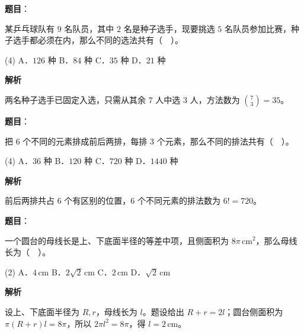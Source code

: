 \begin{answer}

\textbf{题目}：

某乒乓球队有 $9$ 名队员，其中 $2$ 名是种子选手，现要挑选 $5$ 名队员参加比赛，种子选手都必须在内，那么不同的选法共有（　）。

\begin{gkopts}(4)
\task A．$126$ 种
\task B．$84$ 种
\task C．$35$ 种
\task D．$21$ 种
\end{gkopts}

\textbf{解析}

两名种子选手已固定入选，只需从其余 $7$ 人中选 $3$ 人，方法数为 $\binom73=35$。


\end{answer}
\begin{answer}

\textbf{题目}：

把 $6$ 个不同的元素排成前后两排，每排 $3$ 个元素，那么不同的排法共有（　）。

\begin{gkopts}(4)
\task A．$36$ 种
\task B．$120$ 种
\task C．$720$ 种
\task D．$1440$ 种
\end{gkopts}

\textbf{解析}

前后两排共占 $6$ 个有区别的位置，$6$ 个不同元素的排法数为 $6!=720$。


\end{answer}
\begin{answer}

\textbf{题目}：

一个圆台的母线长是上、下底面半径的等差中项，且侧面积为 $8\pi\,\mathrm{cm}^2$，那么母线长为（　）。

\begin{gkopts}(2)
\task A．$4\,\mathrm{cm}$
\task B．$2\sqrt2\,\mathrm{cm}$
\task C．$2\,\mathrm{cm}$
\task D．$\sqrt2\,\mathrm{cm}$
\end{gkopts}

\textbf{解析}

设上、下底面半径为 $R,r$，母线长为 $l$。题设给出 $R+r=2l$；圆台侧面积为 $\pi(R+r)l=8\pi$，所以 $2\pi l^2=8\pi$，得 $l=2\,\mathrm{cm}$。


\end{answer}
